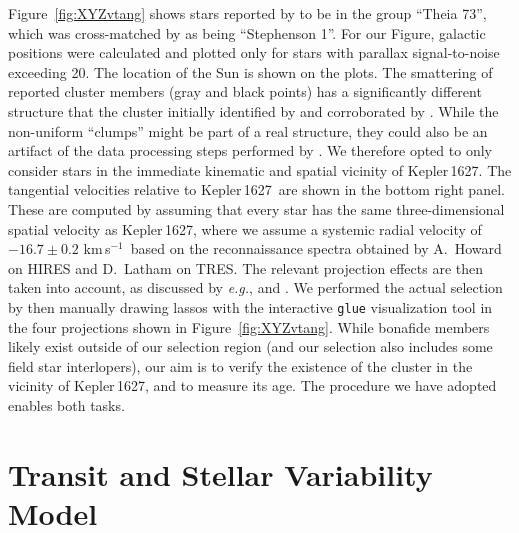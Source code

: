 \documentclass[12pt,modern,twocolumn,tighten]{aastex63}
\newcommand{\sn}{Kepler\,1627} %
\newcommand{\kms}{\,km\,s$^{-1}$}
\begin{document}
Figure~\ref{fig:XYZvtang} shows stars reported by
\citet{kounkel_untangling_2019} to be in the group ``Theia 73'', which
was cross-matched by \citealt{kounkel_untangling_2019} as being
``Stephenson 1''.  For our Figure, galactic positions were calculated
and plotted only for stars with parallax signal-to-noise exceeding 20.
The location of the Sun is shown on the plots.  The smattering of
reported cluster members (gray and black points) has a significantly
different structure that the cluster initially identified by
\citet{stephenson_possible_1959} and corroborated by
\citet{eggen_photometric_1968}.  While the non-uniform ``clumps''
might be part of a real structure, they could also be an artifact of
the data processing steps performed by
\citet{kounkel_untangling_2019}.  We therefore opted to only consider
stars in the immediate kinematic and spatial vicinity of \sn.  The
tangential velocities relative to \sn\ are shown in the bottom right
panel.  These are computed by assuming that every star has the same
three-dimensional spatial velocity as \sn, where we assume a systemic
radial velocity of $-16.7 \pm 0.2$\,\kms\ based on the reconnaissance
spectra obtained by A.~Howard on HIRES and D.~Latham on TRES.  The
relevant projection effects are then taken into account, as discussed
by {\it e.g.}, \citet{Meingast2021} and \citet{bouma_2021_ngc2516}.
We performed the actual selection by then manually drawing lassos with
the interactive \texttt{glue} visualization tool
\citep{beaumont_2014_13866} in the four projections shown in
Figure~\ref{fig:XYZvtang}.  While bonafide members likely exist
outside of our selection region (and our selection also includes some
field star interlopers), our aim is to verify the existence of the
cluster in the vicinity of Kepler\,1627, and to measure its age.  The
procedure we have adopted enables both tasks.


\section{Transit and Stellar Variability Model}
\label{app:gptransit}
\end{document}
